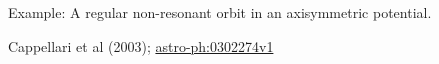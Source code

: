 \documentclass[letterpaper,landscape]{slides}
\begin{document}
\begin{slide}
\begin{center}
{\large \color{red} 
                  Example: A regular non-resonant orbit in an axisymmetric potential. }
\end{center}

\begin{center}
\end{center}

\begin{flushright}
Cappellari et al (2003); \href{https://arxiv.org/pdf/astro-ph/0302274v1.pdf}{astro-ph:0302274v1}
\end{flushright}

\vfill
\end{slide}
\end{document}

